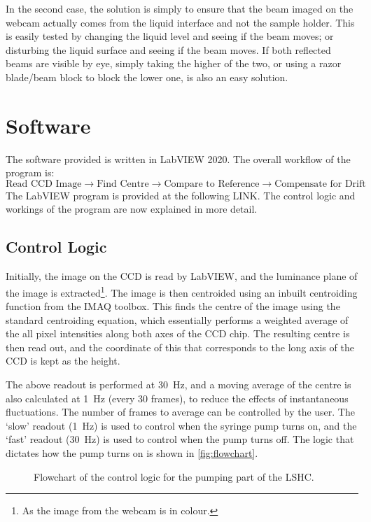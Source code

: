 \documentclass[11pt,a4paper,twoside]{article}
\begin{document}
In the second case, the solution is simply to ensure that the beam imaged on the webcam actually comes from the liquid interface and not the sample holder. This is easily tested by changing the liquid level and seeing if the beam moves; or disturbing the liquid surface and seeing if the beam moves. If both reflected beams are visible by eye, simply taking the higher of the two, or using a razor blade/beam block to block the lower one, is also an easy solution.

\section{Software}
The software provided is written in LabVIEW 2020. The overall workflow of the program is:
\begin{equation*}
\text{Read CCD Image} \rightarrow \text{Find Centre} \rightarrow \text{Compare to Reference} \rightarrow \text{Compensate for Drift}
\end{equation*}
The LabVIEW program is provided at the following LINK. The control logic and workings of the program are now explained in more detail. 
\subsection{Control Logic}
Initially, the image on the CCD is read by LabVIEW, and the luminance plane of the image is extracted\footnote{As the image from the webcam is in colour.}. The image is then centroided using an inbuilt centroiding function from the IMAQ toolbox. This finds the centre of the image using the standard centroiding equation, which essentially performs a weighted average of the all pixel intensities along both axes of the CCD chip. The resulting centre is then read out, and the coordinate of this that corresponds to the long axis of the CCD is kept as the height. 

The above readout is performed at \SI{30}{\hertz}, and a moving average of the centre is also calculated at \SI{1}{\hertz} (every 30 frames), to reduce the effects of instantaneous fluctuations. The number of frames to average can be controlled by the user. The `slow' readout (\SI{1}{\hertz}) is used to control when the syringe pump turns on, and the `fast' readout (\SI{30}{\hertz}) is used to control when the pump turns off. The logic that dictates how the pump turns on is shown in \autoref{fig:flowchart}.

\begin{figure}
\centering

\caption{Flowchart of the control logic for the pumping part of the LSHC.}\label{fig:flowchart}
\end{figure}
\end{document}
